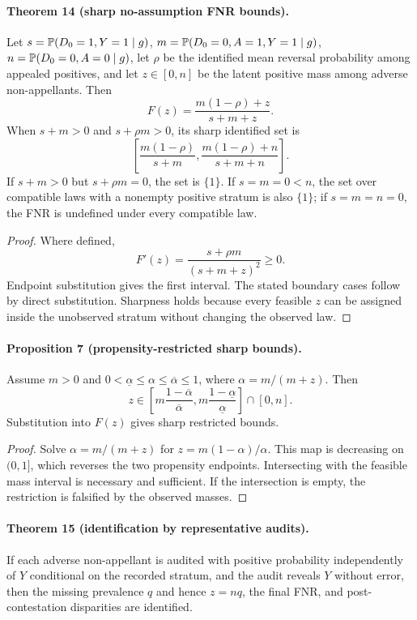 \paragraph{Theorem 14 (sharp no-assumption FNR bounds).}
Let
$s=\mathbb{P}(D_0=1,Y=1\mid g)$,
$m=\mathbb{P}(D_0=0,A=1,Y=1\mid g)$,
$n=\mathbb{P}(D_0=0,A=0\mid g)$,
let $\rho$ be the identified mean reversal probability among appealed
positives, and let $z\in[0,n]$ be the latent positive mass among adverse
non-appellants.  Then
\[
F(z)=\frac{m(1-\rho)+z}{s+m+z}.
\]
When $s+m>0$ and $s+\rho m>0$, its sharp identified set is
\[
\left[\frac{m(1-\rho)}{s+m},
\frac{m(1-\rho)+n}{s+m+n}\right].
\]
If $s+m>0$ but $s+\rho m=0$, the set is $\{1\}$.  If
$s=m=0<n$, the set over compatible laws with a nonempty positive stratum is
also $\{1\}$; if $s=m=n=0$, the FNR is undefined under every compatible law.

\begin{proof}
Where defined,
\[
F'(z)=\frac{s+\rho m}{(s+m+z)^2}\ge0.
\]
Endpoint substitution gives the first interval.  The stated boundary cases
follow by direct substitution.  Sharpness holds because every feasible $z$
can be assigned inside the unobserved stratum without changing the observed
law.
\end{proof}

\paragraph{Proposition 7 (propensity-restricted sharp bounds).}
Assume $m>0$ and
$0<\underline\alpha\le\alpha\le\overline\alpha\le1$, where
$\alpha=m/(m+z)$.  Then
\[
z\in\left[
m\frac{1-\overline\alpha}{\overline\alpha},
m\frac{1-\underline\alpha}{\underline\alpha}
\right]\cap[0,n].
\]
Substitution into $F(z)$ gives sharp restricted bounds.

\begin{proof}
Solve $\alpha=m/(m+z)$ for $z=m(1-\alpha)/\alpha$.  This map is decreasing
on $(0,1]$, which reverses the two propensity endpoints.  Intersecting with
the feasible mass interval is necessary and sufficient.  If the intersection
is empty, the restriction is falsified by the observed masses.
\end{proof}

\paragraph{Theorem 15 (identification by representative audits).}
If each adverse non-appellant is audited with positive probability independently
of $Y$ conditional on the recorded stratum, and the audit reveals $Y$ without
error, then the missing prevalence $q$ and hence $z=nq$, the final FNR, and
post-contestation disparities are identified.

